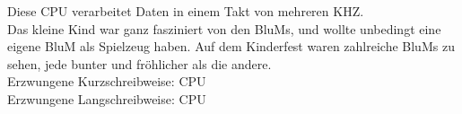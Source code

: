 Diese \ac{CPU} verarbeitet Daten in einem Takt von mehreren \ac{KHZ}.\\
Das kleine Kind war ganz fasziniert von den \acp{BluM}, und wollte unbedingt eine eigene \ac{BluM} als Spielzeug haben. 
Auf dem Kinderfest waren zahlreiche \acp{BluM} zu sehen, jede bunter und fröhlicher als die andere.\\

Erzwungene Kurzschreibweise: \acs{CPU}\\
Erzwungene Langschreibweise: \acl{CPU}